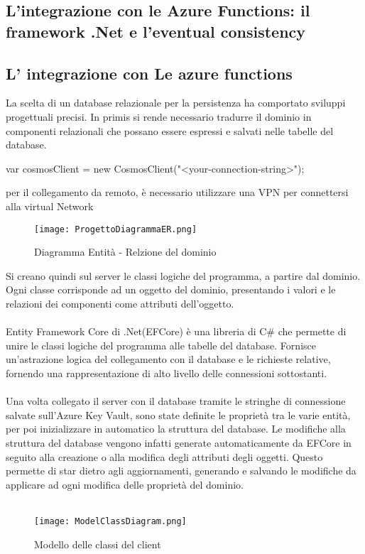 \subsection{L'integrazione con le Azure Functions: il framework .Net e l'eventual consistency}

\clearpage




\clearpage




\subsection{L' integrazione con Le azure functions}

La scelta di un database relazionale per la persistenza ha comportato sviluppi progettuali precisi.
In primis si rende necessario tradurre il dominio in componenti relazionali che possano essere espressi e salvati nelle tabelle del database.

var cosmosClient = new CosmosClient("<your-connection-string>");

per il collegamento da remoto, è necessario utilizzare una VPN per connettersi alla virtual Network

\begin{figure}[h!]
    \centering
    \texttt{[image: ProgettoDiagrammaER.png]}
    \caption{Diagramma Entità - Relzione del dominio}
\end{figure}

Si creano quindi sul server le classi logiche del programma, a partire dal dominio.
Ogni classe corrisponde ad un oggetto del dominio, presentando i valori e le relazioni dei componenti come attributi dell’oggetto.\\
\\
Entity Framework Core di .Net(EFCore) è una libreria di C\# che permette di unire le classi logiche del programma alle tabelle del database.
Fornisce un’astrazione logica del collegamento con il database e le richieste relative, fornendo una rappresentazione di alto livello delle connessioni sottostanti. \\
\\
Una volta collegato il server con il database tramite le stringhe di connessione salvate sull’Azure Key Vault,
sono state definite le proprietà tra le varie entità, per poi inizializzare in automatico la struttura del database.
Le modifiche alla struttura del database vengono infatti generate automaticamente da EFCore in seguito alla creazione o alla modifica degli attributi degli oggetti.
Questo permette di star dietro agli aggiornamenti, generando e salvando le modifiche da applicare ad ogni modifica delle proprietà del dominio.\\
\\
\begin{figure}[h!]
    \begin{center}
        \texttt{[image: ModelClassDiagram.png]}
        \caption{Modello delle classi del client}
    \end{center}
\end{figure}

